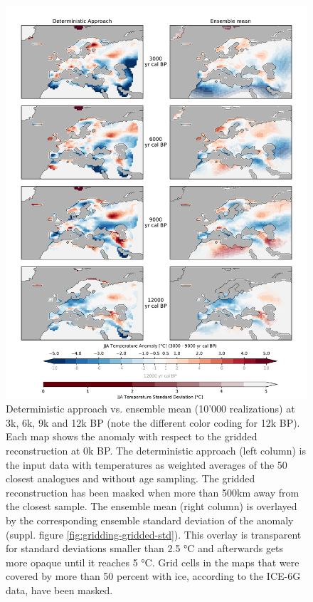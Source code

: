 \documentclass[
11pt, %
english, %
singlespacing, %
headsepline, %
]{MastersDoctoralThesis} %
\begin{document}
\begin{NoHyper}
\begin{refsection}
\begin{figure}
	\captionsetup{width=\linewidth}
	\includegraphics[width=\linewidth]{gridding-figures/deterministic-vs-ensemble.pdf}
	\caption[Deterministic approach vs. Ensemble mean]{Deterministic approach vs. ensemble mean (10'000 realizations) at 3k, 6k, 9k and 12k BP (note the different color coding for 12k BP). Each map shows the anomaly with respect to the gridded reconstruction at 0k BP. The deterministic approach (left column) is the input data with temperatures as weighted averages of the 50 closest analogues and without age sampling. The gridded reconstruction has been masked when more than 500km away from the closest sample. The ensemble mean (right column) is overlayed by the corresponding ensemble standard deviation of the anomaly (suppl. figure \ref{fig:gridding-gridded-std}). This overlay is transparent for standard deviations smaller than 2.5 °C and afterwards gets more opaque until it reaches 5 °C. Grid cells in the maps that were covered by more than 50 percent with ice, according to the ICE-6G data, have been masked.}
	\label{fig:gridding-gridded-mean}
\end{figure}


\end{refsection}
\end{NoHyper}
\end{document}
